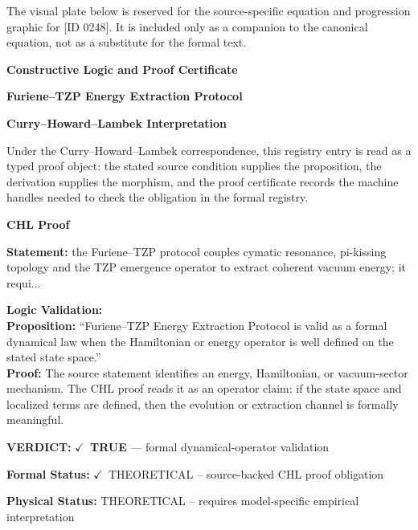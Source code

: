 \begingroup\footnotesize\sloppy
The visual plate below is reserved for the source-specific equation and progression graphic for [ID 0248]. It is included only as a companion to the canonical equation, not as a substitute for the formal text.
\par\endgroup
\ifTZPDarkEdition
{}
\fi

\clearpage
\begingroup\tzpsupportsetup
\noindent\textbf{\fontsize{10.8pt}{12.8pt}\selectfont [ID 0248] Constructive Logic and Proof Certificate}\par
\noindent\textbf{\fontsize{10pt}{12pt}\selectfont Furiene--TZP Energy Extraction Protocol}\par
\vspace{0.45em}
\begingroup
\footnotesize
\setlength{\parskip}{0.22em}
\setlength{\parindent}{0pt}
\noindent\textbf{Curry--Howard--Lambek Interpretation}\par
Under the Curry--Howard--Lambek correspondence, this registry entry is read as a typed proof
object: the stated source condition supplies the proposition, the derivation supplies the
morphism, and the proof certificate records the machine handles needed to check the obligation
in the formal registry.

\vspace{0.45em}
\noindent\textbf{CHL Proof}\par
\textbf{Statement:} the Furiene--TZP protocol couples cymatic resonance, pi-kissing topology and the TZP
emergence operator to extract coherent vacuum energy; it requi...

\textbf{Logic Validation:}\\
\textbf{Proposition:} ``Furiene--TZP Energy Extraction Protocol is valid as a formal dynamical law when the
Hamiltonian or energy operator is well defined on the stated state space.''\\
\textbf{Proof:} The source statement identifies an energy, Hamiltonian, or vacuum-sector mechanism. The
CHL proof reads it as an operator claim: if the state space and localized terms are
defined, then the evolution or extraction channel is formally meaningful.

\textbf{VERDICT:} \ensuremath{\checkmark}\ \textbf{TRUE} --- formal dynamical-operator validation

\textbf{Formal Status:} \ensuremath{\checkmark}\ THEORETICAL -- source-backed CHL proof obligation

\textbf{Physical Status:} THEORETICAL -- requires model-specific empirical interpretation
\par\vspace{0.45em}
\par
\ifTZPDarkEdition
{}
\fi
\endgroup
\endgroup
